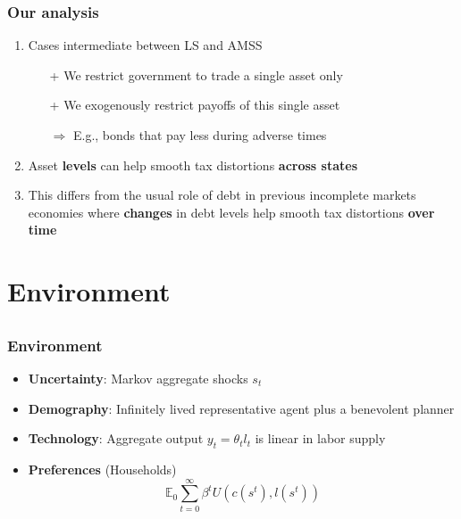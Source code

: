 \documentclass{beamer}
\begin{document}
\begin{frame}
\frametitle{Our analysis}

\begin{enumerate}
\item Cases intermediate between LS and AMSS
\begin{itemize}
\item [+] We restrict government  to trade a single asset only
\item [+] We exogenously restrict payoffs of this single asset

 $\Longrightarrow$ E.g., bonds that pay less during adverse times

 \end{itemize}
\item Asset {\color{black} \textbf{levels} } can help smooth tax distortions {\color{black} \textbf{ across  states}}
\item This differs from the usual role of debt in previous incomplete markets  economies where { \color{black} \textbf{changes}} in debt levels help smooth tax distortions {\color{black}  \textbf{ over  time}}
\end{enumerate}

\end{frame}


\section{Environment}
\subsection{}

\begin{frame}
 \frametitle{Environment}
 \begin{itemize}
 \item \textbf{Uncertainty}: Markov aggregate shocks $s_t$
  \item \textbf{Demography}: Infinitely lived representative agent plus a benevolent planner
  \item \textbf{Technology}: Aggregate output  $y_t=\theta_{t} l_{t}$ is linear in labor supply
  \item \textbf{Preferences }(Households)
  \begin{equation*}
\mathbb{E}_{0}\sum_{t=0}^{\infty } \beta^t  U\left(
c(s^t),l(s^t)\right)  \label{utility lifetime}
\end{equation*}%
 \end{itemize}

\end{frame}
\end{document}
